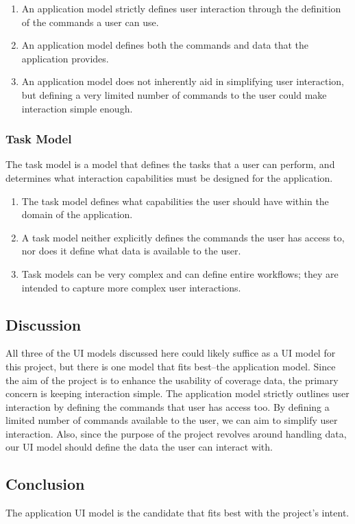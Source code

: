\documentclass[onecolumn, draftclsnofoot,10pt, compsoc]{IEEEtran}
\begin{document}
\begin{enumerate}
\item An application model strictly defines user interaction through the definition of the commands a user can use.
\item An application model defines both the commands and data that the application provides.
\item An application model does not inherently aid in simplifying user interaction, but defining a very limited number of commands to the user could make interaction simple enough.
\end{enumerate}

\subsubsection{Task Model}
The task model is a model that defines the tasks that a user can perform, and determines what interaction capabilities must be designed for the application.

\begin{enumerate}
\item The task model defines what capabilities the user should have within the domain of the application.
\item A task model neither explicitly defines the commands the user has access to, nor does it define what data is available to the user.
\item Task models can be very complex and can define entire workflows; they are intended to capture more complex user interactions.
\end{enumerate}

\subsection{Discussion}
All three of the UI models discussed here could likely suffice as a UI model for this project, but there is one model that fits best–the application model. Since the aim of the project is to enhance the usability of coverage data, the primary concern is keeping interaction simple. The application model strictly outlines user interaction by defining the commands that user has access too. By defining a limited number of commands available to the user, we can aim to simplify user interaction. Also, since the purpose of the project revolves around handling data, our UI model should define the data the user can interact with.

\subsection{Conclusion}
The application UI model is the candidate that fits best with the project’s intent.
\end{document}
